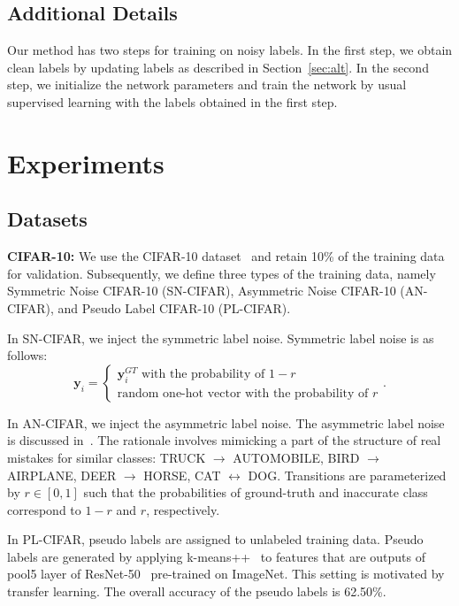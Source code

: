 \documentclass[10pt,twocolumn,letterpaper]{article}
\newcommand{\Sref}[1]{Section~\ref{#1}}
\begin{document}
\subsection{Additional Details}
Our method has two steps for training on noisy labels. In the first step, we obtain clean labels by updating labels as described in \Sref{sec:alt}. In the second step, we initialize the network parameters and train the network by usual supervised learning with the labels obtained in the first step.

\section{Experiments}
\subsection{Datasets}
\noindent\textbf{CIFAR-10:}
We use the CIFAR-10 dataset~\cite{krizhevsky2009learning} and retain 10\% of the training data for validation. Subsequently, we define three types of the training data, namely Symmetric Noise CIFAR-10 (SN-CIFAR), Asymmetric Noise CIFAR-10 (AN-CIFAR), and Pseudo Label CIFAR-10 (PL-CIFAR).

In SN-CIFAR, we inject the symmetric label noise. Symmetric label noise is as follows:
\begin{equation}
\bm{y}_i = \begin{cases}
\bm{y}^{GT}_i \mbox{ with the probability of }1-r \\
\mbox{random one-hot vector with the probability of }r
\end{cases}.
\end{equation}

In AN-CIFAR, we inject the asymmetric label noise. The asymmetric label noise is discussed in~\cite{patrini2016making}. The rationale involves mimicking a part of the structure of real mistakes for similar classes: TRUCK $\rightarrow$ AUTOMOBILE, BIRD $\rightarrow$ AIRPLANE, DEER $\rightarrow$ HORSE, CAT $\leftrightarrow$ DOG. Transitions are parameterized by $r\in[0,1]$ such that the probabilities of ground-truth and inaccurate class correspond to $1-r$ and $r$, respectively.

In PL-CIFAR, pseudo labels are assigned to unlabeled training data. Pseudo labels are generated by applying k-means++~\cite{arthur2007k} to features that are outputs of pool5 layer of ResNet-50~\cite{he2016deep} pre-trained on ImageNet. This setting is motivated by transfer learning. The overall accuracy of the pseudo labels is 62.50\%.
\end{document}
